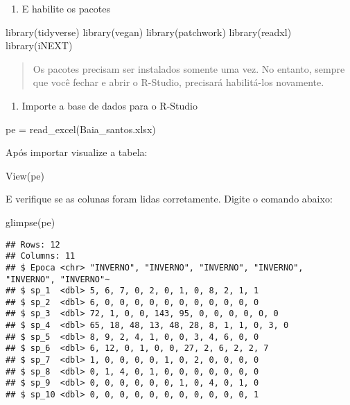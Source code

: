 \documentclass[
]{book}
\newenvironment{Shaded}{\begin{snugshade}}{\end{snugshade}}
\newcommand{\FunctionTok}[1]{\textcolor[rgb]{0.00,0.00,0.00}{#1}}
\newcommand{\NormalTok}[1]{#1}
\newcommand{\OtherTok}[1]{\textcolor[rgb]{0.56,0.35,0.01}{#1}}
\newcommand{\StringTok}[1]{\textcolor[rgb]{0.31,0.60,0.02}{#1}}
\providecommand{\tightlist}{%
  \setlength{\itemsep}{0pt}\setlength{\parskip}{0pt}}
\begin{document}
\begin{enumerate}
\def\labelenumi{\arabic{enumi}.}
\setcounter{enumi}{3}
\tightlist
\item
  E habilite os pacotes
\end{enumerate}

\begin{Shaded}
\begin{Highlighting}[]
\FunctionTok{library}\NormalTok{(tidyverse)}
\FunctionTok{library}\NormalTok{(vegan)}
\FunctionTok{library}\NormalTok{(patchwork)}
\FunctionTok{library}\NormalTok{(readxl)}
\FunctionTok{library}\NormalTok{(iNEXT)}
\end{Highlighting}
\end{Shaded}

\begin{quote}
Os pacotes precisam ser instalados somente uma vez. No entanto, sempre que você fechar e abrir o R-Studio, precisará habilitá-los novamente.
\end{quote}

\begin{enumerate}
\def\labelenumi{\arabic{enumi}.}
\setcounter{enumi}{4}
\tightlist
\item
  Importe a base de dados para o R-Studio
\end{enumerate}

\begin{Shaded}
\begin{Highlighting}[]
\NormalTok{pe }\OtherTok{=} \FunctionTok{read\_excel}\NormalTok{(}\StringTok{\textquotesingle{}Baia\_santos.xlsx\textquotesingle{}}\NormalTok{)}
\end{Highlighting}
\end{Shaded}

Após importar visualize a tabela:

\begin{Shaded}
\begin{Highlighting}[]
\FunctionTok{View}\NormalTok{(pe)}
\end{Highlighting}
\end{Shaded}

E verifique se as colunas foram lidas corretamente. Digite o comando abaixo:

\begin{Shaded}
\begin{Highlighting}[]
\FunctionTok{glimpse}\NormalTok{(pe)}
\end{Highlighting}
\end{Shaded}

\begin{verbatim}
## Rows: 12
## Columns: 11
## $ Epoca <chr> "INVERNO", "INVERNO", "INVERNO", "INVERNO", "INVERNO", "INVERNO"~
## $ sp_1  <dbl> 5, 6, 7, 0, 2, 0, 1, 0, 8, 2, 1, 1
## $ sp_2  <dbl> 6, 0, 0, 0, 0, 0, 0, 0, 0, 0, 0, 0
## $ sp_3  <dbl> 72, 1, 0, 0, 143, 95, 0, 0, 0, 0, 0, 0
## $ sp_4  <dbl> 65, 18, 48, 13, 48, 28, 8, 1, 1, 0, 3, 0
## $ sp_5  <dbl> 8, 9, 2, 4, 1, 0, 0, 3, 4, 6, 0, 0
## $ sp_6  <dbl> 6, 12, 0, 1, 0, 0, 27, 2, 6, 2, 2, 7
## $ sp_7  <dbl> 1, 0, 0, 0, 0, 1, 0, 2, 0, 0, 0, 0
## $ sp_8  <dbl> 0, 1, 4, 0, 1, 0, 0, 0, 0, 0, 0, 0
## $ sp_9  <dbl> 0, 0, 0, 0, 0, 0, 1, 0, 4, 0, 1, 0
## $ sp_10 <dbl> 0, 0, 0, 0, 0, 0, 0, 0, 0, 0, 0, 1
\end{verbatim}
\end{document}
